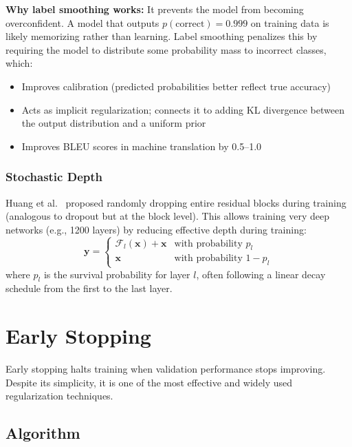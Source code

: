 \textbf{Why label smoothing works:} It prevents the model from becoming overconfident. A model that outputs $p(\text{correct}) = 0.999$ on training data is likely memorizing rather than learning. Label smoothing penalizes this by requiring the model to distribute some probability mass to incorrect classes, which:
\begin{itemize}
    \item Improves calibration (predicted probabilities better reflect true accuracy)
    \item Acts as implicit regularization; \cite{muller2019when} connects it to adding KL divergence between the output distribution and a uniform prior
    \item Improves BLEU scores in machine translation by 0.5--1.0
\end{itemize}

\subsubsection{Stochastic Depth}

Huang et al.\ \cite{huang2016deep} proposed randomly dropping entire residual blocks during training (analogous to dropout but at the block level). This allows training very deep networks (e.g., 1200 layers) by reducing effective depth during training:
\begin{equation}
\mathbf{y} = \begin{cases} \mathcal{F}_l(\mathbf{x}) + \mathbf{x} & \text{with probability } p_l \\ \mathbf{x} & \text{with probability } 1 - p_l \end{cases}
\end{equation}
where $p_l$ is the survival probability for layer $l$, often following a linear decay schedule from the first to the last layer.

\section{Early Stopping}

Early stopping halts training when validation performance stops improving. Despite its simplicity, it is one of the most effective and widely used regularization techniques.

\subsection{Algorithm}

